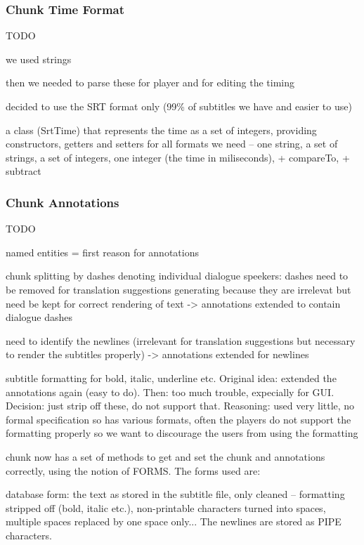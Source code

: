 \subsubsection{Chunk Time Format}

TODO

we used strings

then we needed to parse these for player and for editing the timing

decided to use the SRT format only (99\% of subtitles we have and easier to use)

a class (SrtTime) that represents the time as a set of integers, providing constructors, getters and setters for all formats we need -- one string, a set of strings, a set of integers, one integer (the time in miliseconds), + compareTo, + subtract

\subsubsection{Chunk Annotations}

TODO

named entities = first reason for annotations

chunk splitting by dashes denoting individual dialogue speekers: dashes need to be removed for translation suggestions generating because they are irrelevat but need be kept for correct rendering of text -> annotations extended to contain dialogue dashes

need to identify the newlines (irrelevant for translation suggestions but necessary to render the subtitles properly) -> annotations extended for newlines

subtitle formatting for bold, italic, underline etc. Original idea: extended the annotations again (easy to do). Then: too much trouble, expecially for GUI. Decision: just strip off these, do not support that. Reasoning: used very little, no formal specification so has various formats, often the players do not support the formatting properly so we want to discourage the users from using the formatting

chunk now has a set of methods to get and set the chunk and annotations correctly, using the notion of FORMS. The forms used are:

database form: the text as stored in the subtitle file, only cleaned -- formatting stripped off (bold, italic etc.), non-printable characters turned into spaces, multiple spaces replaced by one space only... The newlines are stored as PIPE characters.

